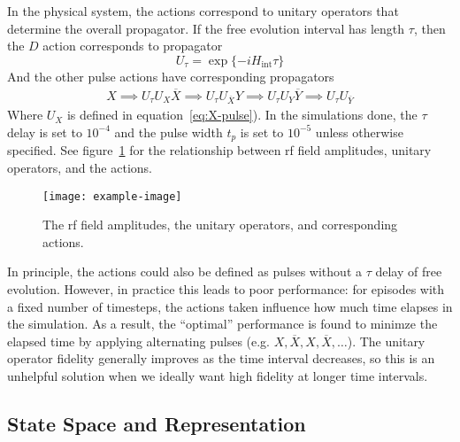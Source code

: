 In the physical system, the actions correspond to unitary operators that determine the overall propagator. If the free evolution interval has length $\tau$, then the $D$ action corresponds to propagator
\[
U_{\tau} = \exp\{ -i H_{\text{int}} \tau \}
\]
And the other pulse actions have corresponding propagators
\begin{align*}
    X \implies U_{\tau} U_X
    \overline{X} \implies U_{\tau} U_{\overline{X}}
    Y \implies U_{\tau} U_Y
    \overline{Y} \implies U_{\tau} U_{\overline{Y}}
\end{align*}
Where $U_X$ is defined in equation~\ref{eq:X-pulse}). In the simulations done, the $\tau$ delay is set to $10^{-4}$ and the pulse width $t_p$ is set to $10^{-5}$ unless otherwise specified.
See figure~\ref{fig:actions} for the relationship between rf field amplitudes, unitary operators, and the actions.

\begin{figure}
    \centering
    \texttt{[image: example-image]}
    \caption{The rf field amplitudes, the unitary operators, and corresponding actions.}
    \label{fig:actions}
\end{figure}

In principle, the actions could also be defined as pulses without a $\tau$ delay of free evolution. However, in practice this leads to poor performance: for episodes with a fixed number of timesteps, the actions taken influence how much time elapses in the simulation. As a result, the ``optimal'' performance is found to minimze the elapsed time by applying alternating pulses (e.g. $X, \overline{X}, X, \overline{X}, \dots$).
The unitary operator fidelity generally improves as the time interval decreases, so this is an unhelpful solution when we ideally want high fidelity at longer time intervals.

\subsection{State Space and Representation}

